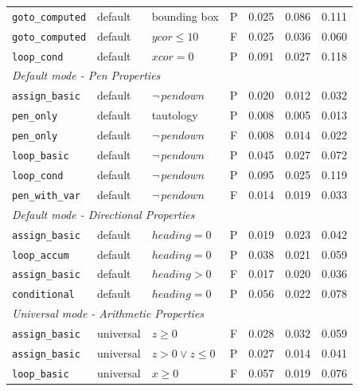 \begin{longtable}{p{} p{} p{} c r r r}
\texttt{goto\_computed}  & default & bounding box                        & P & 0.025 & 0.086 & 0.111 \\
\texttt{goto\_computed}  & default & $\mathit{ycor}\leq 10$              & F & 0.025 & 0.036 & 0.060 \\
\texttt{loop\_cond}      & default & $\mathit{xcor}=0$                   & P & 0.091 & 0.027 & 0.118 \\
\midrule
\multicolumn{7}{l}{\textit{Default mode - Pen Properties}} \\
\midrule
\texttt{assign\_basic}   & default & $\neg\,\mathit{pendown}$           & P & 0.020 & 0.012 & 0.032 \\
\texttt{pen\_only}       & default & tautology                           & P & 0.008 & 0.005 & 0.013 \\
\texttt{pen\_only}       & default & $\neg\,\mathit{pendown}$           & F & 0.008 & 0.014 & 0.022 \\
\texttt{loop\_basic}     & default & $\neg\,\mathit{pendown}$           & P & 0.045 & 0.027 & 0.072 \\
\texttt{loop\_cond}      & default & $\neg\,\mathit{pendown}$           & P & 0.095 & 0.025 & 0.119 \\
\texttt{pen\_with\_var}  & default & $\neg\,\mathit{pendown}$           & F & 0.014 & 0.019 & 0.033 \\
\midrule
\multicolumn{7}{l}{\textit{Default mode - Directional Properties}} \\
\midrule
\texttt{assign\_basic}   & default & $\mathit{heading}=0$               & P & 0.019 & 0.023 & 0.042 \\
\texttt{loop\_accum}     & default & $\mathit{heading}=0$               & P & 0.038 & 0.021 & 0.059 \\
\texttt{assign\_basic}   & default & $\mathit{heading}>0$               & F & 0.017 & 0.020 & 0.036 \\
\texttt{conditional}     & default & $\mathit{heading}=0$               & P & 0.056 & 0.022 & 0.078 \\
\midrule
\multicolumn{7}{l}{\textit{Universal mode - Arithmetic Properties}} \\
\midrule
\texttt{assign\_basic}   & universal & $z \geq 0$                       & F & 0.028 & 0.032 & 0.059 \\
\texttt{assign\_basic}   & universal & $z{>}0\vee z{\leq}0$            & P & 0.027 & 0.014 & 0.041 \\
\texttt{loop\_basic}     & universal & $x \geq 0$                       & F & 0.057 & 0.019 & 0.076 \\

\end{longtable}
